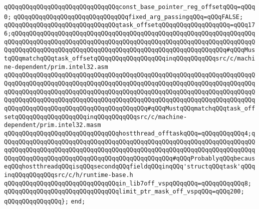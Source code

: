\newline
\verb|qQQqqQQqqQQqqQQqqQQqqQQqqQQqqQQqconst_base_pointer_reg_offsetqQQq=qQQq0;|\newline
\newline
\verb|qQQqqQQqqQQqqQQqqQQqqQQqqQQqqQQqfixed_arg_passingqQQq=qQQqFALSE;|\newline
\newline
\verb|qQQqqQQqqQQqqQQqqQQqqQQqqQQqqQQqtask_offsetqQQqqQQqqQQqqQQqqQQq=qQQq176;qQQqqQQqqQQqqQQqqQQqqQQqqQQqqQQqqQQqqQQqqQQqqQQqqQQqqQQqqQQqqQQqqQQqqQQqqQQqqQQqqQQqqQQqqQQqqQQqqQQqqQQqqQQqqQQqqQQqqQQqqQQqqQQqqQQqqQQqqQQqqQQqqQQqqQQqqQQqqQQqqQQqqQQqqQQqqQQqqQQqqQQqqQQqqQQqqQQqqQQq#qQQqMustqQQqmatchqQQqtask_offsetqQQqqQQqqQQqqQQqqQQqinqQQqqQQqqQQqsrc/c/machine-dependent/prim.intel32.asm|\newline
\verb|qQQqqQQqqQQqqQQqqQQqqQQqqQQqqQQqqQQqqQQqqQQqqQQqqQQqqQQqqQQqqQQqqQQqqQQqqQQqqQQqqQQqqQQqqQQqqQQqqQQqqQQqqQQqqQQqqQQqqQQqqQQqqQQqqQQqqQQqqQQqqQQqqQQqqQQqqQQqqQQqqQQqqQQqqQQqqQQqqQQqqQQqqQQqqQQqqQQqqQQqqQQqqQQqqQQqqQQqqQQqqQQqqQQqqQQqqQQqqQQqqQQqqQQqqQQqqQQqqQQqqQQqqQQqqQQqqQQqqQQqqQQqqQQqqQQqqQQqqQQqqQQqqQQqqQQqqQQqqQQq#qQQqMustqQQqmatchqQQqtask_offsetqQQqqQQqqQQqqQQqqQQqinqQQqqQQqqQQqsrc/c/machine-dependent/prim.intel32.masm|\newline
\newline
\verb|qQQqqQQqqQQqqQQqqQQqqQQqqQQqqQQqhostthread_offtaskqQQq=qQQqqQQqqQQq4;qQQqqQQqqQQqqQQqqQQqqQQqqQQqqQQqqQQqqQQqqQQqqQQqqQQqqQQqqQQqqQQqqQQqqQQqqQQqqQQqqQQqqQQqqQQqqQQqqQQqqQQqqQQqqQQqqQQqqQQqqQQqqQQqqQQqqQQqqQQqqQQqqQQqqQQqqQQqqQQqqQQqqQQqqQQqqQQqqQQqqQQqqQQq#qQQqProbablyqQQqbecauseqQQqhostthreadqQQqisqQQqsecondqQQqfieldqQQqinqQQq'structqQQqtask'qQQqinqQQqqQQqqQQqsrc/c/h/runtime-base.h|\newline
\verb|qQQqqQQqqQQqqQQqqQQqqQQqqQQqqQQqin_lib7off_vspqQQqqQQq=qQQqqQQqqQQq8;|\newline
\newline
\verb|qQQqqQQqqQQqqQQqqQQqqQQqqQQqqQQqlimit_ptr_mask_off_vspqQQq=qQQq200;|\newline
\verb|qQQqqQQqqQQqqQQq};|\newline
\verb|end;|\newline

